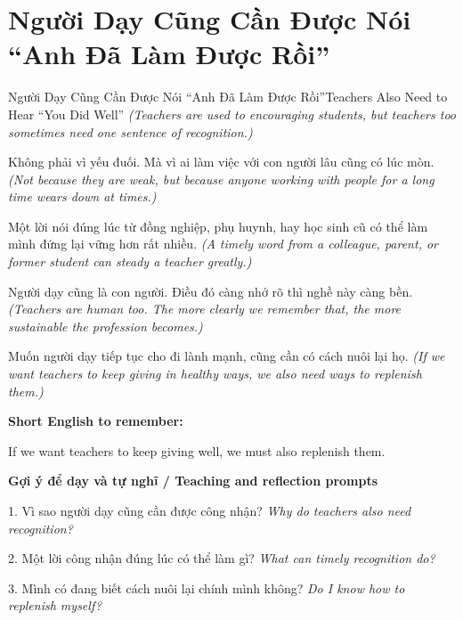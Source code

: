 \section{Người Dạy Cũng Cần Được Nói “Anh Đã Làm Được Rồi”}
\begin{truyen}{Người Dạy Cũng Cần Được Nói “Anh Đã Làm Được Rồi”}{Teachers Also Need to Hear “You Did Well”}
\textit{(Teachers are used to encouraging students, but teachers too sometimes need one sentence of recognition.)}

Không phải vì yếu đuối. Mà vì ai làm việc với con người lâu cũng có lúc mòn.
\textit{(Not because they are weak, but because anyone working with people for a long time wears down at times.)}

Một lời nói đúng lúc từ đồng nghiệp, phụ huynh, hay học sinh cũ có thể làm mình đứng lại vững hơn rất nhiều.
\textit{(A timely word from a colleague, parent, or former student can steady a teacher greatly.)}

Người dạy cũng là con người. Điều đó càng nhớ rõ thì nghề này càng bền.
\textit{(Teachers are human too. The more clearly we remember that, the more sustainable the profession becomes.)}

\end{truyen}

\begin{baihoc}
Muốn người dạy tiếp tục cho đi lành mạnh, cũng cần có cách nuôi lại họ.
\textit{(If we want teachers to keep giving in healthy ways, we also need ways to replenish them.)}
\end{baihoc}

\begin{ghinhoanh}
\textbf{Short English to remember:}

If we want teachers to keep giving well, we must also replenish them.

\end{ghinhoanh}

\begin{tuhocnhanh}
\textbf{Gợi ý để dạy và tự nghĩ / Teaching and reflection prompts}

1. Vì sao người dạy cũng cần được công nhận? \textit{Why do teachers also need recognition?}

2. Một lời công nhận đúng lúc có thể làm gì? \textit{What can timely recognition do?}

3. Mình có đang biết cách nuôi lại chính mình không? \textit{Do I know how to replenish myself?}
\end{tuhocnhanh}
